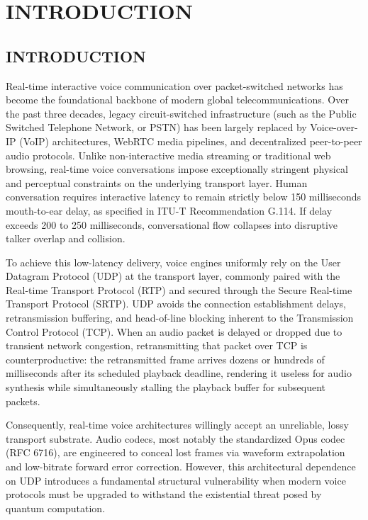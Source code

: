 \chapter{INTRODUCTION}

\section{INTRODUCTION}
Real-time interactive voice communication over packet-switched networks has become the foundational backbone of modern global telecommunications. Over the past three decades, legacy circuit-switched infrastructure (such as the Public Switched Telephone Network, or PSTN) has been largely replaced by Voice-over-IP (VoIP) architectures, WebRTC media pipelines, and decentralized peer-to-peer audio protocols. Unlike non-interactive media streaming or traditional web browsing, real-time voice conversations impose exceptionally stringent physical and perceptual constraints on the underlying transport layer. Human conversation requires interactive latency to remain strictly below 150 milliseconds mouth-to-ear delay, as specified in ITU-T Recommendation G.114. If delay exceeds 200 to 250 milliseconds, conversational flow collapses into disruptive talker overlap and collision.

To achieve this low-latency delivery, voice engines uniformly rely on the User Datagram Protocol (UDP) at the transport layer, commonly paired with the Real-time Transport Protocol (RTP) and secured through the Secure Real-time Transport Protocol (SRTP). UDP avoids the connection establishment delays, retransmission buffering, and head-of-line blocking inherent to the Transmission Control Protocol (TCP). When an audio packet is delayed or dropped due to transient network congestion, retransmitting that packet over TCP is counterproductive: the retransmitted frame arrives dozens or hundreds of milliseconds after its scheduled playback deadline, rendering it useless for audio synthesis while simultaneously stalling the playback buffer for subsequent packets. 

Consequently, real-time voice architectures willingly accept an unreliable, lossy transport substrate. Audio codecs, most notably the standardized Opus codec (RFC 6716), are engineered to conceal lost frames via waveform extrapolation and low-bitrate forward error correction. However, this architectural dependence on UDP introduces a fundamental structural vulnerability when modern voice protocols must be upgraded to withstand the existential threat posed by quantum computation.

